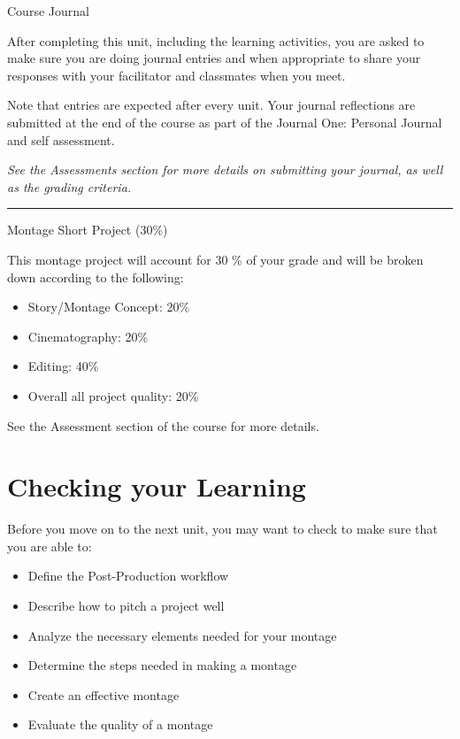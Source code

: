 \documentclass[
]{book}
\providecommand{\tightlist}{%
  \setlength{\itemsep}{0pt}\setlength{\parskip}{0pt}}
\begin{document}
\begin{assessment}
{Course Journal}

After completing this unit, including the learning activities, you are asked to make sure you are doing journal entries and when appropriate to share your responses with your facilitator and classmates when you meet.

Note that entries are expected after every unit. Your journal reflections are submitted at the end of the course as part of the Journal One: Personal Journal and self assessment.

\emph{See the Assessments section for more details on submitting your journal, as well as the grading criteria.}

\begin{center}\rule{0.5\linewidth}{0.5pt}\end{center}

{Montage Short Project (30\%)}

This montage project will account for 30 \% of your grade and will be broken down according to the following:

\begin{itemize}
\tightlist
\item
  Story/Montage Concept: 20\%\\
\item
  Cinematography: 20\%\\
\item
  Editing: 40\%\\
\item
  Overall all project quality: 20\%
\end{itemize}

See the Assessment section of the course for more details.
\end{assessment}

\hypertarget{checking-your-learning-6}{%
\section*{Checking your Learning}\label{checking-your-learning-6}}

\begin{progress}
Before you move on to the next unit, you may want to check to make sure that you are able to:

\begin{itemize}
\tightlist
\item
  Define the Post-Production workflow\\
\item
  Describe how to pitch a project well\\
\item
  Analyze the necessary elements needed for your montage\\
\item
  Determine the steps needed in making a montage\\
\item
  Create an effective montage\\
\item
  Evaluate the quality of a montage
\end{itemize}
\end{progress}
\end{document}
